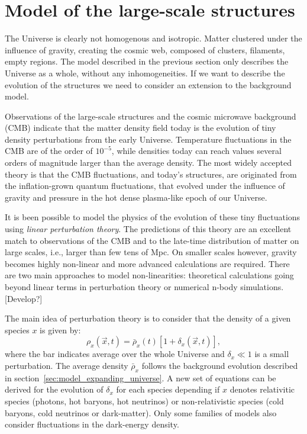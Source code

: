 \section{Model of the large-scale structures}
\label{sec:model_perturbations}

    The Universe is clearly not homogenous and isotropic. 
    Matter clustered under the influence of gravity, creating the cosmic web,
    composed of clusters, filaments, empty regions. 
    The model described in the previous section only describes the Universe
    as a whole, without any inhomogeneities. If we want to describe 
    the evolution of the structures we need to consider an extension to
    the background model. 

    Observations of the large-scale structures and  
    the cosmic microwave background (CMB)
    indicate that the matter density field today is the evolution of 
    tiny density perturbations from the early Universe. 
    Temperature fluctuations in the CMB are of the order of $10^{-5}$, 
    while densities today can reach values several orders of magnitude 
    larger than the average density.
    The most widely accepted theory is that the CMB fluctuations,
    and today's structures, are originated
    from the inflation-grown quantum fluctuations, that evolved under the 
    influence of gravity and pressure in the hot dense plasma-like epoch of our Universe. 
    
    It is been possible to model the physics of the evolution of these tiny 
    fluctuations using \emph{linear perturbation theory}. The predictions of this 
    theory are an excellent match to observations of the CMB and to the late-time
    distribution of matter on large scales, i.e., larger than few tens of Mpc. 
    On smaller scales however, gravity becomes highly non-linear and more advanced 
    calculations are required. There are two main approaches to model non-linearities:
    theoretical calculations going beyond linear terms in perturbation theory 
    or numerical n-body simulations. [Develop?]

    The main idea of perturbation theory is to consider that
    the density of a given species $x$ is given by:
    \begin{equation}
        \rho_x(\vec{x}, t) = \bar{\rho}_x(t)\left[1 + \delta_x(\vec{x}, t)\right],
    \end{equation}
    where the bar indicates average over the whole Universe and 
    $\delta_x \ll 1$ is a small perturbation. The average density 
    $\bar{\rho}_x$ follows the background evolution described in 
    section~\ref{sec:model_expanding_universe}. A new set of equations 
    can be derived for the evolution of $\delta_x$ for each species 
    depending if $x$ denotes relativitic species (photons, hot baryons, hot neutrinos) 
    or non-relativistic species (cold baryons, cold neutrinos or dark-matter). 
    Only some families of models also consider fluctuations in the dark-energy density.

